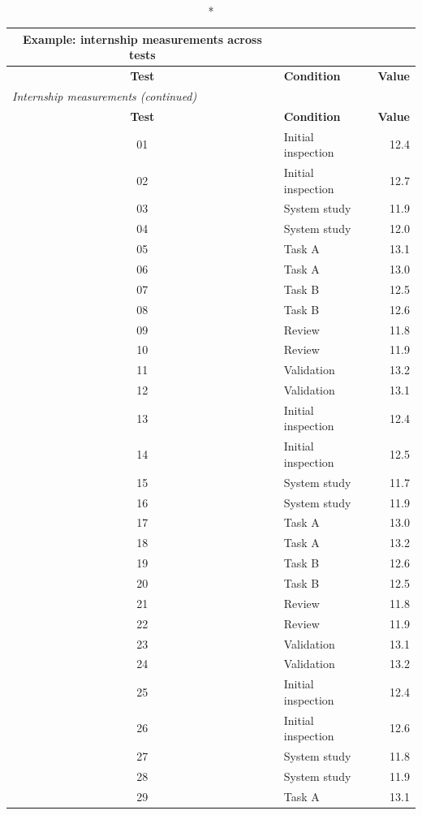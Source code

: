 {\begin{longtable}{|c|l|r|}
\caption*{Example: internship measurements across tests}\\
\hline
\textbf{Test} & \textbf{Condition} & \textbf{Value} \\
\hline
\endfirsthead
\multicolumn{3}{l}{\textit{Internship measurements (continued)}}\\
\hline
\textbf{Test} & \textbf{Condition} & \textbf{Value} \\
\hline
\endhead
01 & Initial inspection & 12.4 \\\hline
02 & Initial inspection & 12.7 \\\hline
03 & System study & 11.9 \\\hline
04 & System study & 12.0 \\\hline
05 & Task A & 13.1 \\\hline
06 & Task A & 13.0 \\\hline
07 & Task B & 12.5 \\\hline
08 & Task B & 12.6 \\\hline
09 & Review & 11.8 \\\hline
10 & Review & 11.9 \\\hline
11 & Validation & 13.2 \\\hline
12 & Validation & 13.1 \\\hline
13 & Initial inspection & 12.4 \\\hline
14 & Initial inspection & 12.5 \\\hline
15 & System study & 11.7 \\\hline
16 & System study & 11.9 \\\hline
17 & Task A & 13.0 \\\hline
18 & Task A & 13.2 \\\hline
19 & Task B & 12.6 \\\hline
20 & Task B & 12.5 \\\hline
21 & Review & 11.8 \\\hline
22 & Review & 11.9 \\\hline
23 & Validation & 13.1 \\\hline
24 & Validation & 13.2 \\\hline
25 & Initial inspection & 12.4 \\\hline
26 & Initial inspection & 12.6 \\\hline
27 & System study & 11.8 \\\hline
28 & System study & 11.9 \\\hline
29 & Task A & 13.1 \\\hline

\end{longtable}}
